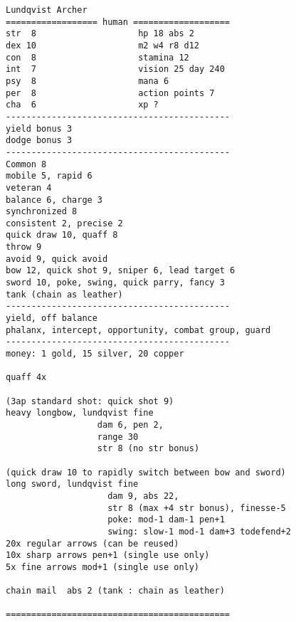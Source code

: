 \goodbreak \small \begin{samepage} \begin{verbatim}
Lundqvist Archer
================== human ===================
str  8                    hp 18 abs 2
dex 10                    m2 w4 r8 d12
con  8                    stamina 12
int  7                    vision 25 day 240
psy  8                    mana 6
per  8                    action points 7
cha  6                    xp ?
--------------------------------------------
yield bonus 3
dodge bonus 3
--------------------------------------------
Common 8
mobile 5, rapid 6
veteran 4
balance 6, charge 3
synchronized 8
consistent 2, precise 2
quick draw 10, quaff 8
throw 9
avoid 9, quick avoid
bow 12, quick shot 9, sniper 6, lead target 6
sword 10, poke, swing, quick parry, fancy 3
tank (chain as leather)
--------------------------------------------
yield, off balance
phalanx, intercept, opportunity, combat group, guard
--------------------------------------------
money: 1 gold, 15 silver, 20 copper

quaff 4x

(3ap standard shot: quick shot 9)
heavy longbow, lundqvist fine      
                  dam 6, pen 2,
                  range 30
                  str 8 (no str bonus)

(quick draw 10 to rapidly switch between bow and sword)
long sword, lundqvist fine
                    dam 9, abs 22,
                    str 8 (max +4 str bonus), finesse-5
                    poke: mod-1 dam-1 pen+1
                    swing: slow-1 mod-1 dam+3 todefend+2
20x regular arrows (can be reused)
10x sharp arrows pen+1 (single use only)
5x fine arrows mod+1 (single use only)

chain mail  abs 2 (tank : chain as leather)

============================================
\end{verbatim} \end{samepage} \normalsize

\

